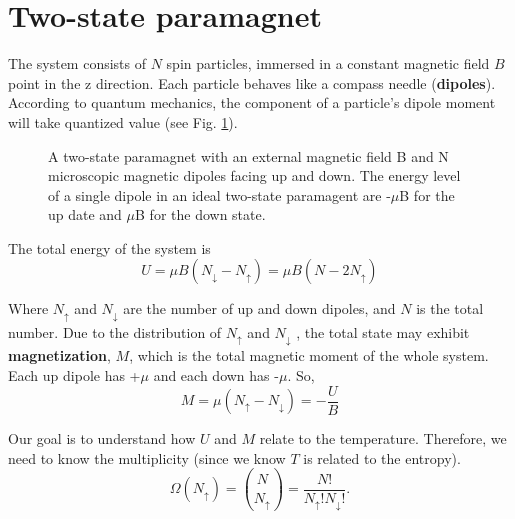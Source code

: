 
\section{Two-state paramagnet}
The system consists of $N$ spin particles, immersed in a constant magnetic field $B$ point in the z direction. Each particle behaves like a compass needle (\textbf{dipoles}). According to quantum mechanics, the component of a particle's dipole moment will take quantized value (see Fig. \ref{fig-dipole}). 

\begin{figure}[h]
\centering
{}
\caption{A two-state paramagnet with an external magnetic field B and N microscopic magnetic dipoles facing up and down. The energy level of a single dipole in an ideal two-state paramagent are -$\mu$B for the up date and $\mu$B for the down state.}
\label{fig-dipole}
\end{figure}

The total energy of the system is
\begin{equation} \label{eq1} 
U = \mu B(N_{\downarrow} - N_{\uparrow}) = \mu B(N-2N_{\uparrow})
\end{equation}

Where $N_{\uparrow}$ and $N_{\downarrow}$ are the number of up and down dipoles, and $N$ is the total number. Due to the distribution of $N_{\uparrow}$ and $N_{\downarrow}$ , the total state may exhibit \textbf{magnetization}, $M$, which is the total magnetic moment of the whole system. Each up dipole has +$\mu$ and each down has -$\mu$. So,
\begin{equation}
    M = \mu(N_{\uparrow} - N_{\downarrow}) = -\frac{U}{B}
\end{equation}

Our goal is to understand how $U$ and $M$ relate to the temperature. Therefore, we need to know the multiplicity (since we know $T$ is related to the entropy).
\begin{equation}
    \Omega(N_{\uparrow}) = \binom{N}{N_{\uparrow}} = \frac{N!}{N_{\uparrow}!N_{\downarrow}!}.
\end{equation}

